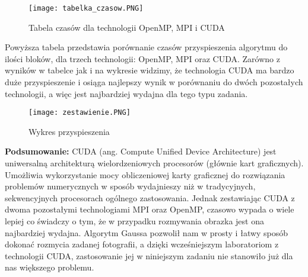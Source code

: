 \documentclass[a4paper,12pt]{article}
\begin{document}
\begin{wrapfigure}{r}{0.5\textwidth}
	\vspace{-40pt}
	\begin{center}
		\texttt{[image: tabelka\_czasow.PNG]}
	\end{center}
	\vspace{-20pt}
	\caption{Tabela czasów dla technologii OpenMP, MPI i CUDA}
	\vspace{35pt}
\end{wrapfigure}
Powyższa tabela przedstawia porównanie czasów przyspieszenia algorytmu do ilości bloków, dla trzech technologii: OpenMP, MPI oraz CUDA.
Zarówno z wyników w tabelce jak i na wykresie widzimy, że technologia CUDA ma bardzo duże przyspieszenie i osiąga najlepszy wynik w porównaniu 
do dwóch pozostałych technologii, a więc jest najbardziej wydajna dla tego typu zadania.

\begin{wrapfigure}{r}{0.5\textwidth}
	\vspace{-40pt}
	\begin{center}
		\texttt{[image: zestawienie.PNG]}
	\end{center}
	\vspace{-20pt}
	\caption{Wykres przyspieszenia}
	\vspace{35pt}
\end{wrapfigure}

\textbf{Podsumowanie:} CUDA (ang. Compute Unified Device Architecture) jest uniwersalną architekturą wielordzeniowych procesorów (głównie kart graficznych). Umożliwia wykorzystanie mocy obliczeniowej karty graficznej do rozwiązania problemów numerycznych w sposób wydajnieszy niż w tradycyjnych, sekwencyjnych procesorach ogólnego zastosowania.
Jednak zestawiając CUDA z dwoma pozostałymi technologiami MPI oraz OpenMP, czasowo wypada o wiele lepiej co świadczy o tym, że w przypadku rozmywania obrazka jest ona najbardziej wydajna. Algorytm Gaussa pozwolił nam w prosty i łatwy sposób dokonać rozmycia zadanej fotografii, a dzięki wcześniejszym laboratoriom z technologii CUDA, zastosowanie jej w niniejszym zadaniu nie stanowiło już dla nas większego problemu. 
\end{document}
